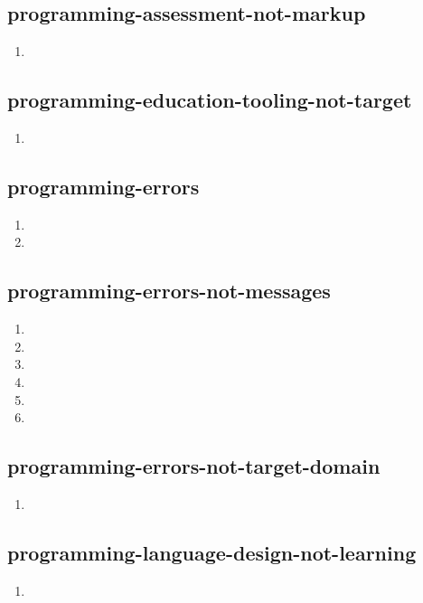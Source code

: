 \documentclass{article}
\begin{document}
\subsection{programming-assessment-not-markup}
\begin{enumerate}
\item {}
\end{enumerate}

\subsection{programming-education-tooling-not-target}
\begin{enumerate}
\item {}
\end{enumerate}

\subsection{programming-errors}
\begin{enumerate}
\item {}
\item {}
\end{enumerate}

\subsection{programming-errors-not-messages}
\begin{enumerate}
\item {}
\item {}
\item {}
\item {}
\item {}
\item {}
\end{enumerate}

\subsection{programming-errors-not-target-domain}
\begin{enumerate}
\item {}
\end{enumerate}

\subsection{programming-language-design-not-learning}
\begin{enumerate}
\item {}
\end{enumerate}
\end{document}
